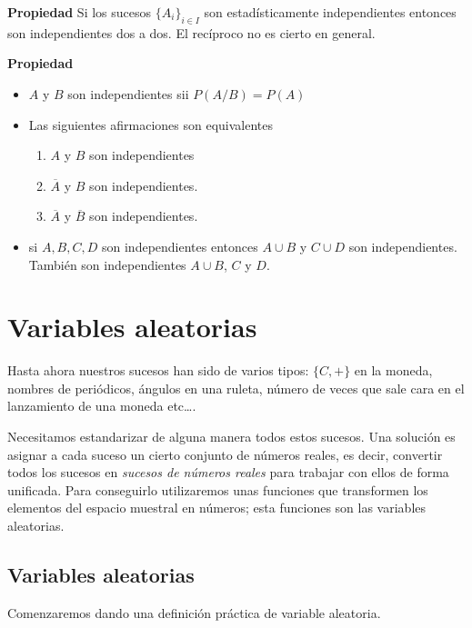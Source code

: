 \documentclass[12pt]{report}
\begin{document}
           \textbf{Propiedad}
           Si los sucesos $\{A_{i}\}_{i\in I}$ son es\-ta\-dís\-ti\-ca\-men\-te
           independientes entonces son independientes dos a dos. El
           recíproco no es cierto en general.



           \textbf{Propiedad}
           \begin{itemize}
               \item $A$ y $B$ son independientes sii $P(A/B)=P(A)$
            \item Las siguientes afirmaciones son equivalentes
            \begin{enumerate}
            \item $A$ y $B$ son independientes
            \item  $\overline{A}$ y $B$ son independientes.
            \item $\overline{A}$ y $\overline{B}$ son independientes.
            \end{enumerate}

            \item si $A,B,C,D$ son independientes entonces
            $A\cup B$ y $C\cup D$ son independientes. También son
            independientes $A\cup B$, $C$ y $D$.
\end{itemize}
\chapter{Variables aleatorias}
  Hasta ahora nuestros sucesos han sido de varios tipos: $\{C,+\}$ en
  la moneda, nombres de periódicos, ángulos en una ruleta, número de
  veces que sale cara en el lanzamiento de una moneda etc\ldots.

  Necesitamos estandarizar de alguna manera todos estos sucesos. Una
  solución es asignar a cada suceso un cierto conjunto de
  números reales, es decir, convertir todos los sucesos en
  \emph{sucesos de números reales} para trabajar con ellos de forma
  unificada. Para conseguirlo utilizaremos  unas funciones que
  transformen los elementos del espacio muestral en números; esta funciones son las
  variables aleatorias.

  \section{Variables aleatorias}
 Comenzaremos dando una definición práctica de  variable aleatoria.
\end{document}
